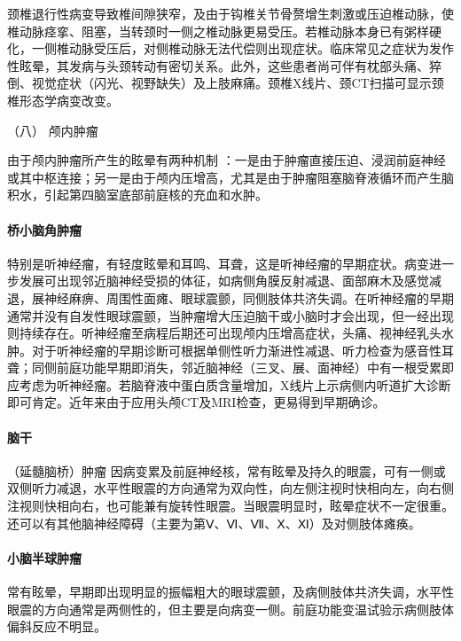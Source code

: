 颈椎退行性病变导致椎间隙狭窄，及由于钩椎关节骨赘增生刺激或压迫椎动脉，使椎动脉痉挛、阻塞，当转颈时一侧之椎动脉更易受压。若椎动脉本身已有粥样硬化，一侧椎动脉受压后，对侧椎动脉无法代偿则出现症状。临床常见之症状为发作性眩晕，其发病与头颈转动有密切关系。此外，这些患者尚可伴有枕部头痛、猝倒、视觉症状（闪光、视野缺失）及上肢麻痛。颈椎X线片、颈CT扫描可显示颈椎形态学病变改变。

\hypertarget{text00012.htmlux5cux23CHP1-3-2-6-8}{}
（八） 颅内肿瘤

由于颅内肿瘤所产生的眩晕有两种机制
：一是由于肿瘤直接压迫、浸润前庭神经或其中枢连接；另一是由于颅内压增高，尤其是由于肿瘤阻塞脑脊液循环而产生脑积水，引起第四脑室底部前庭核的充血和水肿。

\paragraph{桥小脑角肿瘤}

特别是听神经瘤，有轻度眩晕和耳鸣、耳聋，这是听神经瘤的早期症状。病变进一步发展可出现邻近脑神经受损的体征，如病侧角膜反射减退、面部麻木及感觉减退，展神经麻痹、周围性面瘫、眼球震颤，同侧肢体共济失调。在听神经瘤的早期通常并没有自发性眼球震颤，当肿瘤增大压迫脑干或小脑时才会出现，但一经出现则持续存在。听神经瘤至病程后期还可出现颅内压增高症状，头痛、视神经乳头水肿。对于听神经瘤的早期诊断可根据单侧性听力渐进性减退、听力检查为感音性耳聋；同侧前庭功能早期即消失，邻近脑神经（三叉、展、面神经）中有一根受累即应考虑为听神经瘤。若脑脊液中蛋白质含量增加，X线片上示病侧内听道扩大诊断即可肯定。近年来由于应用头颅CT及MRI检查，更易得到早期确诊。

\paragraph{脑干}

（延髓脑桥）肿瘤
因病变累及前庭神经核，常有眩晕及持久的眼震，可有一侧或双侧听力减退，水平性眼震的方向通常为双向性，向左侧注视时快相向左，向右侧注视则快相向右，也可能兼有旋转性眼震。当眼震明显时，眩晕症状不一定很重。还可以有其他脑神经障碍（主要为第Ⅴ、Ⅵ、Ⅶ、Ⅹ、Ⅺ）及对侧肢体瘫痪。

\paragraph{小脑半球肿瘤}

常有眩晕，早期即出现明显的振幅粗大的眼球震颤，及病侧肢体共济失调，水平性眼震的方向通常是两侧性的，但主要是向病变一侧。前庭功能变温试验示病侧肢体偏斜反应不明显。

